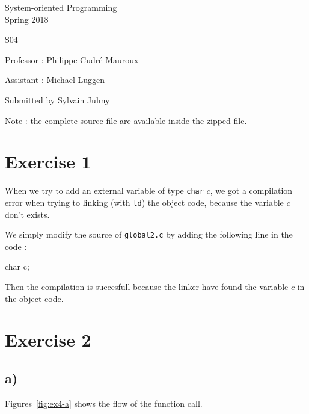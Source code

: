 \documentclass[a4paper,11pt]{report}
\author{Sylvain Julmy}
\date{\today}
\begin{document}
\begin{center}
  \Large{
    System-oriented Programming\\
    Spring 2018
  }
  
  \noindent\makebox[\linewidth]{\rule{\linewidth}{0.4pt}}
  S04
  \noindent\makebox[\linewidth]{\rule{\linewidth}{0.4pt}}

  \begin{flushleft}
    Professor : Philippe Cudré-Mauroux

    Assistant : Michael Luggen
  \end{flushleft}
  
  \noindent\makebox[\linewidth]{\rule{\linewidth}{0.4pt}}

  Submitted by Sylvain Julmy
  
  \noindent\makebox[\linewidth]{\rule{\textwidth}{1pt}}
\end{center}

Note : the complete source file are available inside the zipped file.

\section*{Exercise 1}

When we try to add an external variable of type \verb+char+ $c$, we got a
compilation error when trying to linking (with \verb+ld+) the object code,
because the variable $c$ don't exists.

We simply modify the source of \verb+global2.c+ by adding the following line in
the code :

\begin{ccode}
char c;
\end{ccode}

Then the compilation is succesfull because the linker have found the variable
$c$ in the object code.

\section*{Exercise 2}

\subsection*{a)}

Figures~\ref{fig:ex4-a} shows the flow of the function call.
\end{document}

